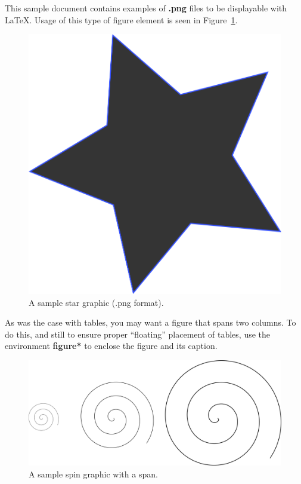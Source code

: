 \documentclass[article]{stucosrec}
\begin{document}
	This sample document contains examples of \textbf{.png} files to be displayable with \LaTeX.
	Usage of this type of figure element is seen in Figure~\ref{fig:star}.
	
	\begin{figure}
		\centering
		\includegraphics[scale=0.5]{star.png}
		\caption{A sample star graphic (.png format).}
		\label{fig:star}
	\end{figure}

	As was the case with tables, you may want a figure that spans two columns.
	To do this, and still to ensure proper ``floating'' placement of tables, use the environment \textbf{figure*} to enclose the figure and its caption.
	
	\begin{figure}
		\centering
		\includegraphics[scale=0.8]{spin.png}
		\caption{A sample spin graphic with a span.}
		\label{fig:spin}
	\end{figure}
\end{document}
